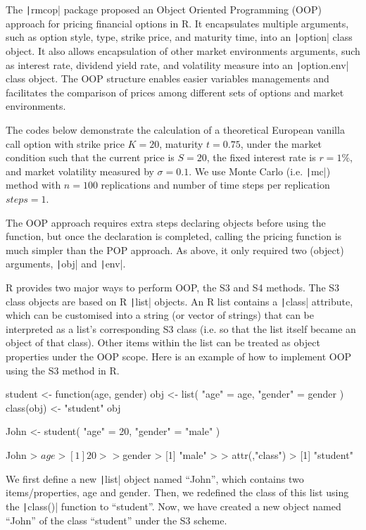 The \texttt|rmcop| package proposed an Object Oriented Programming (OOP) approach for pricing financial options in R. It encapsulates multiple arguments, such as option style, type, strike price, and maturity time, into an \texttt|option| class object. It also allows encapsulation of other market environments arguments, such as interest rate, dividend yield rate, and volatility measure into an \texttt|option.env| class object. The OOP structure enables easier variables managements and facilitates the comparison of prices among different sets of options and market environments.

The codes below demonstrate the calculation of a theoretical European vanilla call option with strike price $K = 20$, maturity $t = 0.75$, under the market condition such that the current price is $S = 20$, the fixed interest rate is $r = 1\%$, and market volatility measured by $\sigma = 0.1$. We use Monte Carlo (i.e. \texttt|mc|) method with $n = 100$ replications and number of time steps per replication $steps = 1$.

The OOP approach requires extra steps declaring objects before using the function, but once the declaration is completed, calling the pricing function is much simpler than the POP approach. As above, it only required two (object) arguments, \texttt|obj| and \texttt|env|.

R provides two major ways to perform OOP, the S3 and S4 methods. The S3 class objects are based on R \texttt|list| objects. An R list contains a \texttt|class| attribute, which can be customised into a string (or vector of strings) that can be interpreted as a list's corresponding S3 class (i.e. so that the list itself became an object of that class). Other items within the list can be treated as object properties under the OOP scope. Here is an example of how to implement OOP using the S3 method in R.

\begin{Rminted}
student <- function(age, gender) {
    obj <- list(
        "age" = age,
        "gender" = gender
    )
    class(obj) <- "student"
    obj
}

John <- student(
    "age" = 20,
    "gender" = "male"
)

John
> $age
> [1] 20
> 
> $gender
> [1] "male"
> 
> attr(,"class")
> [1] "student"
\end{Rminted}

We first define a new \texttt|list| object named ``John'', which contains two items/properties, age and gender. Then, we redefined the class of this list using the \texttt|class()| function to ``student''. Now, we have created a new object named ``John'' of the class ``student'' under the S3 scheme.

